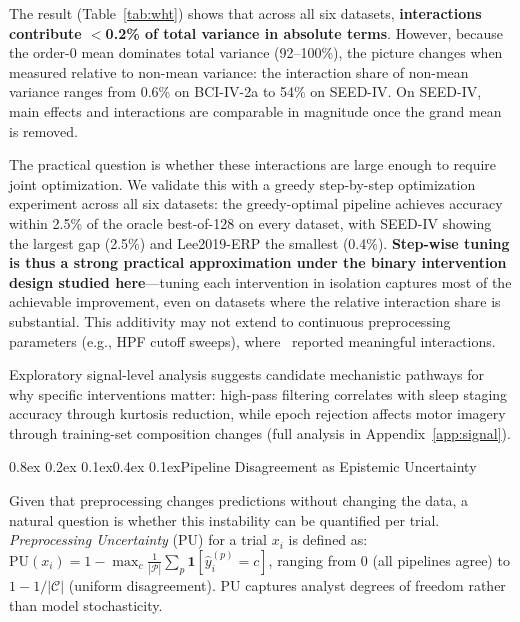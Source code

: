 \documentclass{article}
\makeatletter
\renewcommand{\subsection}{\@startsection{subsection}{2}{\z@}%
  {0.8ex \@plus 0.2ex \@minus 0.1ex}{0.4ex \@plus 0.1ex}{\normalsize\bf}}
\makeatother
\begin{document}
The result (Table~\ref{tab:wht}) shows that across all six datasets, \textbf{interactions contribute $<$0.2\% of total variance in absolute terms}. However, because the order-0 mean dominates total variance (92--100\%), the picture changes when measured relative to non-mean variance: the interaction share of non-mean variance ranges from 0.6\% on BCI-IV-2a to 54\% on SEED-IV. On SEED-IV, main effects and interactions are comparable in magnitude once the grand mean is removed.

The practical question is whether these interactions are large enough to require joint optimization. We validate this with a greedy step-by-step optimization experiment across all six datasets: the greedy-optimal pipeline achieves accuracy within 2.5\% of the oracle best-of-128 on every dataset, with SEED-IV showing the largest gap (2.5\%) and Lee2019-ERP the smallest (0.4\%). \textbf{Step-wise tuning is thus a strong practical approximation under the binary intervention design studied here}---tuning each intervention in isolation captures most of the achievable improvement, even on datasets where the relative interaction share is substantial. This additivity may not extend to continuous preprocessing parameters (e.g., HPF cutoff sweeps), where~\citet{kessler2025preprocessing} reported meaningful interactions.

Exploratory signal-level analysis suggests candidate mechanistic pathways for why specific interventions matter: high-pass filtering correlates with sleep staging accuracy through kurtosis reduction, while epoch rejection affects motor imagery through training-set composition changes (full analysis in Appendix~\ref{app:signal}).

\subsection{Pipeline Disagreement as Epistemic Uncertainty}

Given that preprocessing changes predictions without changing the data, a natural question is whether this instability can be quantified per trial.
\emph{Preprocessing Uncertainty} (PU) for a trial $x_i$ is defined as:
$\text{PU}(x_i) = 1 - \max_{c} \frac{1}{|\mathcal{P}|}\sum_{p} \mathbf{1}[\hat{y}_i^{(p)} = c]$,
ranging from 0 (all pipelines agree) to $1-1/|\mathcal{C}|$ (uniform disagreement). PU captures analyst degrees of freedom rather than model stochasticity.
\end{document}

